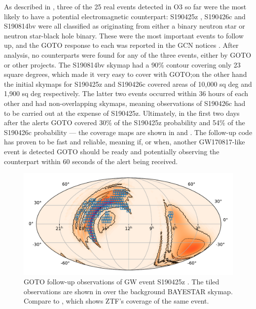 \begin{colsection}
\begin{colsection}
As described in , three of the 25 real events detected in O3 so far were the most likely to have a potential electromagnetic counterpart: S190425z \citep{S190425z}, S190426c \citep{S190426c} and S190814bv \citep{S190814bv} were all classified as originating from either a binary neutron star or neutron star-black hole binary. These were the most important events to follow up, and the GOTO response to each was reported in the GCN notices \citet{S190425z_GOTO, S190426c_GOTO, S190814bv_GOTO}. After analysis, no counterparts were found for any of the three events, either by GOTO or other projects. The S190814bv skymap had a 90\% contour covering only 23 square degrees, which made it very easy to cover with GOTO;\@ on the other hand the initial skymaps for S190425z and S190426c covered areas of 10,000 sq deg and 1,900 sq deg respectively. The latter two events occurred within 36 hours of each other and had non-overlapping skymaps, meaning observations of S190426c had to be carried out at the expense of S190425z. Ultimately, in the first two days after the alerts GOTO covered 30\% of the S190425z probability \citep{S190425z_GOTO} and 54\% of the S190426c probability \citep{S190426c_GOTO} --- the coverage maps are shown in  and . The follow-up code has proven to be fast and reliable, meaning if, or when, another GW170817-like event is detected GOTO should be ready and potentially observing the counterpart within 60 seconds of the alert being received.

\begin{figure}[p]
    \begin{center}
        \includegraphics[width=0.9\linewidth]{images/190425_goto.pdf}
    \end{center}
    \caption[Follow-up observations of S190425z with GOTO]{
        GOTO follow-up observations of GW event S190425z \citep{S190425z_GOTO}. The tiled observations are shown in  over the background BAYESTAR skymap. Compare to , which shows ZTF's coverage of the same event.
        }\label{fig:190425_goto}
\end{figure}


\end{colsection}
\end{colsection}
